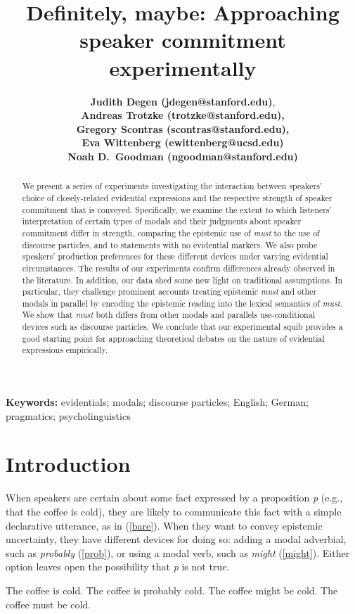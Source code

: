 \documentclass[11pt]{article}
\title{Definitely, maybe: Approaching speaker commitment experimentally}
\author{{\large \bf Judith Degen (jdegen@stanford.edu)}, \\ {\large \bf Andreas Trotzke (trotzke@stanford.edu),}\\ {\large \bf Gregory Scontras (scontras@stanford.edu),}\\  {\large \bf Eva Wittenberg (ewittenberg@ucsd.edu)}\\ {\large \bf Noah D.~Goodman (ngoodman@stanford.edu)}}
\begin{document}
\maketitle

\begin{abstract}

We present a series of experiments investigating the interaction between speakers’ choice of closely-related evidential expressions and the respective strength of speaker commitment that is conveyed. Specifically, we examine the extent to which listeners' interpretation of certain types of modals and their judgments about speaker commitment differ in strength, comparing the epistemic use of \emph{must} to the use of discourse particles, and to statements with no evidential markers. We also probe speakers' production preferences for these different devices under varying evidential circumstances. The results of our experiments confirm differences already observed in the literature. In addition, our data shed some new light on traditional assumptions. In particular, they challenge prominent accounts treating epistemic \emph{must} and other modals in parallel by encoding the epistemic reading into the lexical semantics of \emph{must}. We show that \emph{must} both differs from other modals and parallels use-conditional devices such as discourse particles. We conclude that our experimental squib provides a good starting point for approaching theoretical debates on the nature of evidential expressions empirically.

\end{abstract}

\textbf{Keywords:} 
evidentials; modals; discourse particles; English; German; pragmatics; psycholinguistics


\section{Introduction}

When speakers are certain about some fact expressed by a proposition \emph{p} (e.g., that the coffee is cold), they are likely to communicate this fact with a simple declarative utterance, as in (\ref{bare}). When they want to convey epistemic uncertainty, they have different devices for doing so: adding a modal adverbial, such as \emph{probably} (\ref{prob}), or using a modal verb, such as \emph{might} (\ref{might}). Either option leaves open the possibility that \emph{p} is not true.

\begin{exe}
	\ex\label{english} \begin{xlist}
		\ex\label{bare} The coffee is cold.
		\ex\label{prob} The coffee is probably cold.
		\ex\label{might} The coffee might be cold.
		\ex\label{must} The coffee must be cold.
	\end{xlist}
\end{exe}
\end{document}
